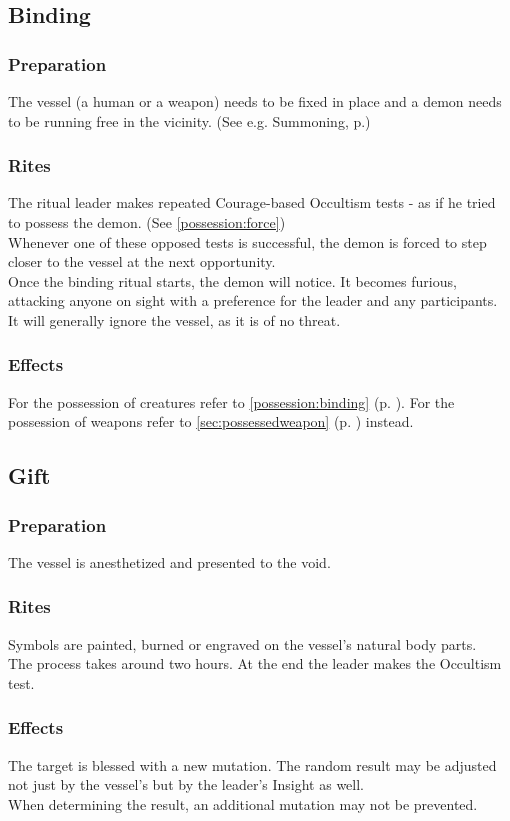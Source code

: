 \subsection*{Binding}
\label{ritual:binding}
\subsubsection*{Preparation}
The vessel (a human or a weapon) needs to be fixed in place and a demon needs to be running free in the vicinity.
(See e.g. Summoning, p.\pageref{ritual:summoning})
\subsubsection*{Rites}
The ritual leader makes repeated Courage-based Occultism tests
- as if he tried to possess the demon.
(See \ref{possession:force})
\\%
Whenever one of these opposed tests is successful,
the demon is forced to step closer to the vessel at the next opportunity.
\\%
Once the binding ritual starts, the demon will notice.
It becomes furious, attacking anyone on sight with a preference for the leader and any participants.
It will generally ignore the vessel, as it is of no threat.
\subsubsection*{Effects}
For the possession of creatures refer to \ref{possession:binding} (p. \pageref{possession:binding}).
For the possession of weapons refer to \ref{sec:possessedweapon} (p. \pageref{sec:possessedweapon}) instead.

\subsection*{Gift}
\subsubsection*{Preparation}
The vessel is anesthetized and presented to the void.
\subsubsection*{Rites}
Symbols are painted, burned or engraved on the vessel's natural body parts.
\\%
The process takes around two hours.
At the end the leader makes the Occultism test.
\subsubsection*{Effects}
The target is blessed with a new mutation.
The random result may be adjusted not just by the vessel's
	but by the leader's Insight as well.
\\%
When determining the result,
	an additional mutation may not be prevented.


